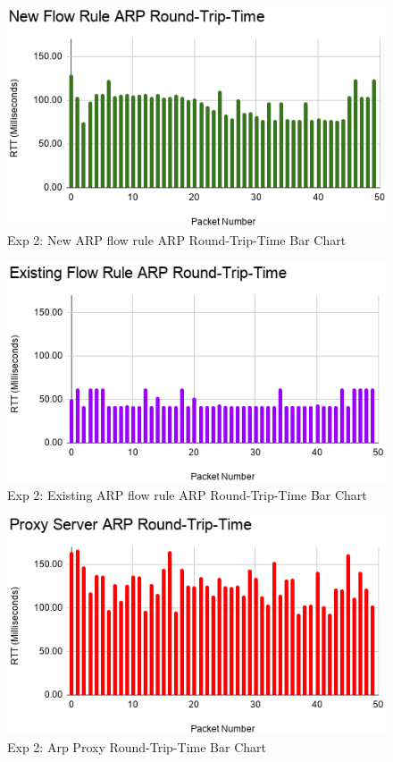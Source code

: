 \documentclass[12pt, oneside]{book}
\begin{document}
\begin{figure}[H]
	\centering
	\includegraphics[scale=0.7]{../tests/RTT/NFlow_RTT.png}
	\caption{Exp 2: New ARP flow rule ARP Round-Trip-Time Bar Chart}
	\label{fig:newarprtt}
\end{figure}

\begin{figure}[H]
	\centering
	\includegraphics[scale=0.7]{../tests/RTT/EFlow_RTT.png}
	\caption{Exp 2: Existing ARP flow rule ARP Round-Trip-Time Bar Chart}
	\label{fig:exisarprtt}
\end{figure}

\begin{figure}[H]
	\centering
	\includegraphics[scale=0.7]{../tests/RTT/PARP_RTT.png}
	\caption{Exp 2: Arp Proxy Round-Trip-Time Bar Chart}
	\label{fig:proxyrtt}
\end{figure}
\end{document}
